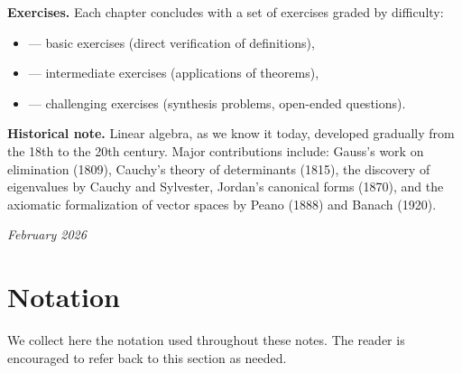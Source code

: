 \documentclass[a4paper,11pt,twoside,openright]{book}
\begin{document}
\medskip

\noindent\textbf{Exercises.}
Each chapter concludes with a set of exercises graded by difficulty:
\begin{itemize}
  \item \basic{} --- basic exercises (direct verification of definitions),
  \item \intermediate{} --- intermediate exercises (applications of theorems),
  \item \challenging{} --- challenging exercises (synthesis problems, open-ended questions).
\end{itemize}

\medskip

\noindent\textbf{Historical note.}
Linear algebra, as we know it today, developed gradually from the 18th to the 20th century. Major contributions include: Gauss's work on elimination (1809), Cauchy's theory of determinants (1815), the discovery of eigenvalues by Cauchy and Sylvester, Jordan's canonical forms (1870), and the axiomatic formalization of vector spaces by Peano (1888) and Banach (1920).

\vfill
\begin{flushright}
\textit{February 2026}
\end{flushright}

\chapter*{Notation}

We collect here the notation used throughout these notes. The reader is encouraged to refer back to this section as needed.

\bigskip
\end{document}

